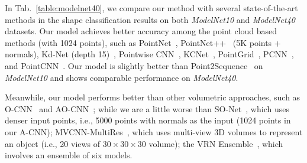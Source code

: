 \documentclass[10pt,twocolumn,letterpaper]{article}
\begin{document}
In Tab.~\ref{table:modelnet40}, we compare our method with several state-of-the-art methods in the shape classification results on both \textit{ModelNet10} and \textit{ModelNet40} datasets. Our model achieves better accuracy among the point cloud based methods (with 1024 points), such as PointNet~\cite{qi2017pointnet}, PointNet++~\cite{qi2017pointnet++} (5K points + normals), Kd-Net (depth 15)~\cite{klokov2017escape}, Pointwise CNN~\cite{hua2018pointwise}, KCNet~\cite{shen2018mining}, PointGrid~\cite{le2018pointgrid}, PCNN~\cite{atzmon2018point}, and PointCNN~\cite{li2018pointcnn}. Our model is slightly better than Point2Sequence~\cite{liu2018point2sequence} on \emph{ModelNet10} and shows comparable performance on \emph{ModelNet40}.

Meanwhile, our model performs better than other volumetric approaches, such as O-CNN~\cite{wang2017cnn} and AO-CNN~\cite{Wang-2018-AOCNN}; while we are a little worse than SO-Net~\cite{li2018so}, which uses denser input points, i.e., 5000 points with normals as the input (1024 points in our A-CNN); MVCNN-MultiRes~\cite{qi2016volumetric}, which uses multi-view 3D volumes to represent an object (i.e., 20 views of $30 \times 30 \times 30$ volume); the VRN Ensemble~\cite{brock2016generative}, which involves an ensemble of six models.
\end{document}

